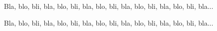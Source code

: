 \documentclass{article}
\begin{document}
\begin{test}
  Bla, blo, bli, bla, blo, bli, bla, blo, bli, bla, blo, bli, bla, blo, bli, bla...
\end{test}
\begin{blub}
  Bla, blo, bli, bla, blo, bli, bla, blo, bli, bla, blo, bli, bla, blo, bli, bla...
\end{blub}
\end{document}
